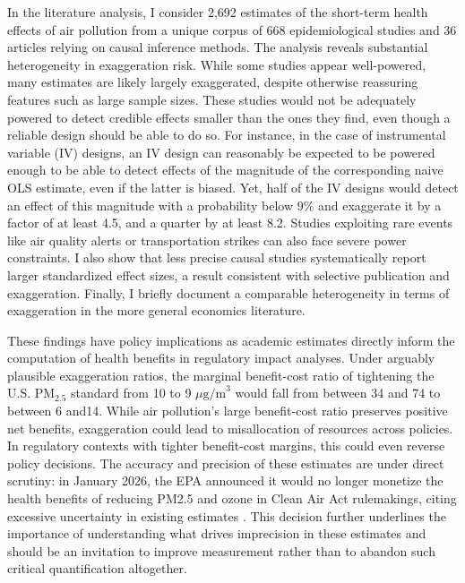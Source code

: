 \documentclass[12pt]{article}
\begin{document}
		In the literature analysis, I consider 2,692 estimates of the short-term health effects of air pollution from a unique corpus of 668 epidemiological studies and 36 articles relying on causal inference methods. The analysis reveals substantial heterogeneity in exaggeration risk. While some studies appear well-powered, many estimates are likely largely exaggerated, despite otherwise reassuring features such as large sample sizes. These studies would not be adequately powered to detect credible effects smaller than the ones they find, even though a reliable design should be able to do so. For instance, in the case of instrumental variable (IV) designs, an IV design can reasonably be expected to be powered enough to be able to detect effects of the magnitude of the corresponding naive OLS estimate, even if the latter is biased. Yet, half of the IV designs would detect an effect of this magnitude with a probability below 9\% and exaggerate it by a factor of at least 4.5, and a quarter by at least 8.2. Studies exploiting rare events like air quality alerts or transportation strikes can also face severe power constraints. I also show that less precise causal studies systematically report larger standardized effect sizes, a result consistent with selective publication and exaggeration. Finally, I briefly document a comparable heterogeneity in terms of  exaggeration in the more general economics literature.
		
		These findings have policy implications as academic estimates directly inform the computation of health benefits in regulatory impact analyses. Under arguably plausible exaggeration ratios, the marginal benefit-cost ratio of tightening the U.S. $\text{PM}_{2.5}$ standard from 10 to 9 $\mu\text{g/m}^3$ would fall from between 34 and 74 to between 6 and14. While air pollution's large benefit-cost ratio preserves positive net benefits, exaggeration could lead to misallocation of resources across policies. In regulatory contexts with tighter benefit-cost margins, this could even reverse policy decisions. The accuracy and precision of these estimates are under direct scrutiny: in January 2026, the EPA announced it would no longer monetize the health benefits of reducing PM2.5 and ozone in Clean Air Act rulemakings, citing excessive uncertainty in existing estimates \citep{u.s.epa_economic_2026}. This decision further underlines the importance of understanding what drives imprecision in these estimates and should be an invitation to improve measurement rather than to abandon such critical quantification altogether.
		
\end{document}
